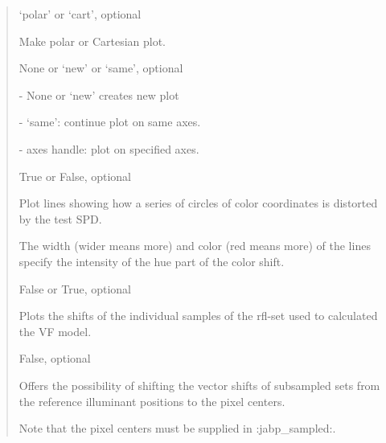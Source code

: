 \documentclass[letterpaper,10pt,english]{sphinxmanual}
\begin{document}
\begin{fulllineitems}
\begin{description}
\begin{quote}
\begin{description}
\item[{axtype}] \leavevmode
\begin{DUlineblock}{0em}
\item[] ‘polar’ or ‘cart’, optional
\item[] Make polar or Cartesian plot.
\end{DUlineblock}

\item[{ax}] \leavevmode
\begin{DUlineblock}{0em}
\item[] None or ‘new’ or ‘same’, optional
\item[]
\begin{DUlineblock}{\DUlineblockindent}
\item[] - None or ‘new’ creates new plot
\item[] - ‘same’: continue plot on same axes.
\item[] - axes handle: plot on specified axes. 
\end{DUlineblock}
\end{DUlineblock}

\item[{plot\_circle\_field}] \leavevmode
\begin{DUlineblock}{0em}
\item[] True or False, optional
\item[] Plot lines showing how a series of circles of color coordinates is 
distorted by the test SPD.
\item[] The width (wider means more) and color (red means more) of the 
lines specify the intensity of the hue part of the color shift.
\end{DUlineblock}

\item[{plot\_sample\_shifts}] \leavevmode
\begin{DUlineblock}{0em}
\item[] False or True, optional
\item[] Plots the shifts of the individual samples of the rfl-set used to 
calculated the VF model.
\end{DUlineblock}

\item[{plot\_samples\_shifts\_at\_pixel\_center}] \leavevmode
\begin{DUlineblock}{0em}
\item[] False, optional
\item[] Offers the possibility of shifting the vector shifts of subsampled 
sets from the reference illuminant positions to the pixel centers.
\item[] Note that the pixel centers must be supplied in :jabp\_sampled:.
\end{DUlineblock}


\end{description}
\end{quote}
\end{description}
\end{fulllineitems}
\end{document}
